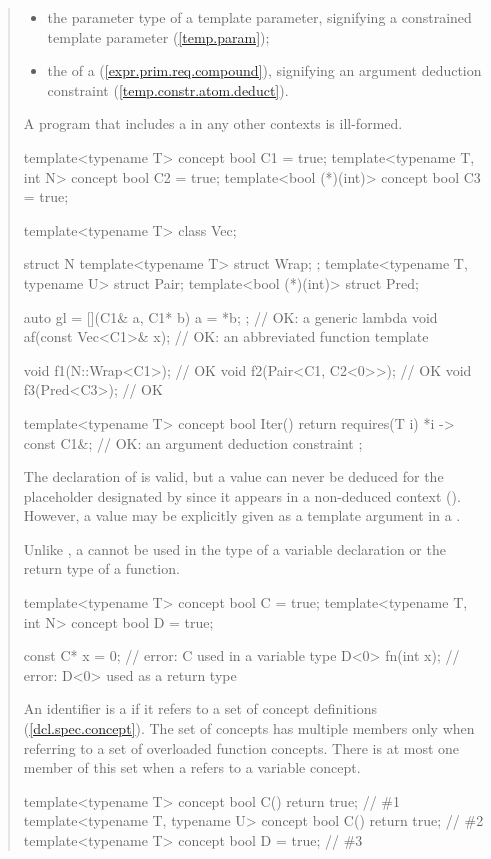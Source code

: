 \begin{quote}
\begin{itemize}
\item the parameter type of a template parameter, signifying a
     constrained template parameter (\ref{temp.param});

\item the  of
     a  (\ref{expr.prim.req.compound}),
     signifying an argument deduction constraint (\ref{temp.constr.atom.deduct}).
\end{itemize}
% 
A program that includes a 
in any other contexts is ill-formed.
% 
\enterexample
\begin{codeblock}
template<typename T> concept bool C1 = true;
template<typename T, int N> concept bool C2 = true;
template<bool (*)(int)> concept bool C3 = true;

template<typename T> class Vec;

struct N {
  template<typename T> struct Wrap;
};
template<typename T, typename U> struct Pair;
template<bool (*)(int)> struct Pred;

auto gl = [](C1& a, C1* b) { a = *b; }; // OK: a generic lambda
void af(const Vec<C1>& x);              // OK: an abbreviated function template

void f1(N::Wrap<C1>);     // OK
void f2(Pair<C1, C2<0>>); // OK
void f3(Pred<C3>);        // OK

template<typename T> concept bool Iter() {
  return requires(T i) {
    {*i} -> const C1&; // OK: an argument deduction constraint
  };
}
\end{codeblock}
The declaration of  is valid, but a value can never be deduced 
for the placeholder designated by  since it appears in a
non-deduced context ().
% 
However, a value may be explicitly given as a template argument in a
.
\exitexample

\pnum
\enternote
Unlike , a  cannot
be used in the type of a variable declaration or the return type of
a function.
\enterexample
\begin{codeblock}
template<typename T> concept bool C = true;
template<typename T, int N> concept bool D = true;

const C* x = 0;  // error: C used in a variable type
D<0> fn(int x);  // error: D<0> used as a return type
\end{codeblock}
\exitexample
\exitnote

\pnum
An identifier is a  if it refers to a set of 
concept definitions (\ref{dcl.spec.concept}).
%
\enternote
The set of concepts has multiple members only when referring to a set of 
overloaded function concepts. There is at most one member of this set when a
 refers to a variable concept.
\exitnote
%
\enterexample
\begin{codeblock}
template<typename T> concept bool C() { return true; }             // \#1
template<typename T, typename U> concept bool C() { return true; } // \#2
template<typename T> concept bool D = true;                        // \#3


\end{codeblock}
\end{quote}
